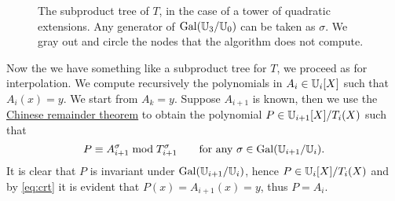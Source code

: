 \begin{figure}[tb]
  \centering
  
  \hfill
  
  \caption{The subproduct tree of $T$, in the case of a tower of
    quadratic extensions. Any generator of $\operatorname{Gal}(\mathbb{U}_3/\mathbb{U}_0)$ can be
    taken as $\sigma$. We gray out and circle the nodes that the
    algorithm does not compute.}
  \label{fig:tree}
\end{figure}


Now the we have something like a subproduct tree for $T$, we proceed
as for interpolation. We compute recursively the polynomials in
$A_i\in\mathbb{U}_i[X]$ such that $A_i(x)=y$. We start from $A_k=y$. Suppose
$A_{i+1}$ is known, then we use the
\hyperref[th:chinese-remainder]{Chinese remainder theorem} to obtain
the polynomial $P\in\mathbb{U}_{i+1}[X]/T_i(X)$ such that
\begin{equation}
  \label{eq:crt}
  P \equiv A_{i+1}^\sigma \bmod T_{i+1}^\sigma
  \qquad\text{for any $\sigma\in\operatorname{Gal}(\mathbb{U}_{i+1}/\mathbb{U}_i)$.}
\end{equation}
It is clear that $P$ is invariant under $\operatorname{Gal}(\mathbb{U}_{i+1}/\mathbb{U}_i)$, hence
$P\in\mathbb{U}_i[X]/T_i(X)$ and by \eqref{eq:crt} it is evident that
$P(x)=A_{i+1}(x)=y$, thus $P=A_i$.

